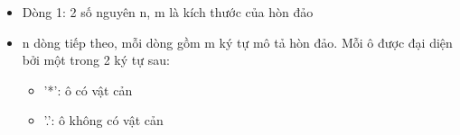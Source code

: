 \begin{itemize}
	\item Dòng 1: 2 số nguyên n, m là kích thước của hòn đảo
	\item n dòng tiếp theo, mỗi dòng gồm m ký tự mô tả hòn đảo. Mỗi ô được đại diện bởi một trong 2 ký tự sau:

\begin{itemize}
	\item '*': ô có vật cản
	\item '.': ô không có vật cản
\end{itemize}
\end{itemize}